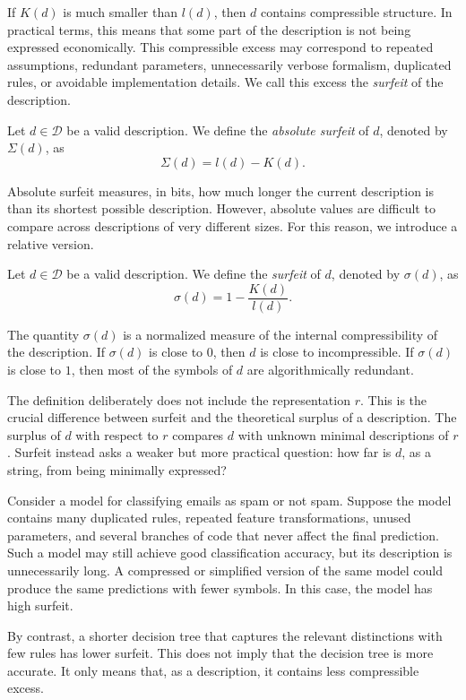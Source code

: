 If \(K(d)\) is much smaller than \(l(d)\), then \(d\) contains compressible structure. In practical terms, this means that some part of the description is not being expressed economically. This compressible excess may correspond to repeated assumptions, redundant parameters, unnecessarily verbose formalism, duplicated rules, or avoidable implementation details. We call this excess the \emph{surfeit} of the description.

\begin{definition}
Let \(d\in\mathcal D\) be a valid description. We define the \emph{absolute surfeit} of \(d\), denoted by \(\Sigma(d)\), as
\[
\Sigma(d)=l(d)-K(d).
\]
\end{definition}

Absolute surfeit measures, in bits, how much longer the current description is than its shortest possible description. However, absolute values are difficult to compare across descriptions of very different sizes. For this reason, we introduce a relative version.

\begin{definition}[Surfeit]
Let \(d\in\mathcal D\) be a valid description. We define the \emph{surfeit} of \(d\), denoted by \(\sigma(d)\), as
\[
\sigma(d)=1-\frac{K(d)}{l(d)}.
\]
\end{definition}

The quantity \(\sigma(d)\) is a normalized measure of the internal compressibility of the description. If \(\sigma(d)\) is close to \(0\), then \(d\) is close to incompressible. If \(\sigma(d)\) is close to \(1\), then most of the symbols of \(d\) are algorithmically redundant.

The definition deliberately does not include the representation \(r\). This is the crucial difference between surfeit and the theoretical surplus of a description. The surplus of \(d\) with respect to \(r\) compares \(d\) with unknown minimal descriptions of \(r\). Surfeit instead asks a weaker but more practical question: how far is \(d\), as a string, from being minimally expressed?

\begin{example}
Consider a model for classifying emails as spam or not spam. Suppose the model contains many duplicated rules, repeated feature transformations, unused parameters, and several branches of code that never affect the final prediction. Such a model may still achieve good classification accuracy, but its description is unnecessarily long. A compressed or simplified version of the same model could produce the same predictions with fewer symbols. In this case, the model has high surfeit.

By contrast, a shorter decision tree that captures the relevant distinctions with few rules has lower surfeit. This does not imply that the decision tree is more accurate. It only means that, as a description, it contains less compressible excess.
\end{example}

